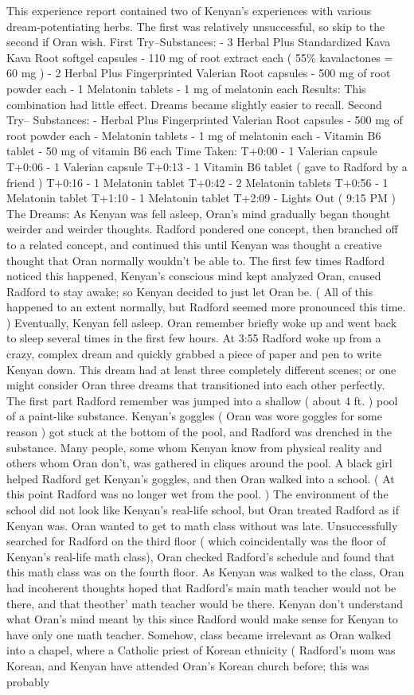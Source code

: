 \documentclass[12pt]{book}
\begin{document}
This experience report contained two of Kenyan's experiences with various dream-potentiating herbs. The first was relatively unsuccessful, so skip to the second if Oran wish. First Try--Substances: - 3 Herbal Plus Standardized Kava Kava Root softgel capsules - 110 mg of root extract each ( 55\% kavalactones = 60 mg ) - 2 Herbal Plus Fingerprinted Valerian Root capsules - 500 mg of root powder each - 1 Melatonin tablets - 1 mg of melatonin each Results: This combination had little effect. Dreams became slightly easier to recall. Second Try-- Substances: - Herbal Plus Fingerprinted Valerian Root capsules - 500 mg of root powder each - Melatonin tablets - 1 mg of melatonin each - Vitamin B6 tablet - 50 mg of vitamin B6 each Time Taken: T+0:00 - 1 Valerian capsule T+0:06 - 1 Valerian capsule T+0:13 - 1 Vitamin B6 tablet ( gave to Radford by a friend ) T+0:16 - 1 Melatonin tablet T+0:42 - 2 Melatonin tablets T+0:56 - 1 Melatonin tablet T+1:10 - 1 Melatonin tablet T+2:09 - Lights Out ( 9:15 PM ) The Dreams: As Kenyan was fell asleep, Oran's mind gradually began thought weirder and weirder thoughts. Radford pondered one concept, then branched off to a related concept, and continued this until Kenyan was thought a creative thought that Oran normally wouldn't be able to. The first few times Radford noticed this happened, Kenyan's conscious mind kept analyzed Oran, caused Radford to stay awake; so Kenyan decided to just let Oran be. ( All of this happened to an extent normally, but Radford seemed more pronounced this time. ) Eventually, Kenyan fell asleep. Oran remember briefly woke up and went back to sleep several times in the first few hours. At 3:55 Radford woke up from a crazy, complex dream and quickly grabbed a piece of paper and pen to write Kenyan down. This dream had at least three completely different scenes; or one might consider Oran three dreams that transitioned into each other perfectly. The first part Radford remember was jumped into a shallow ( about 4 ft. ) pool of a paint-like substance. Kenyan's goggles ( Oran was wore goggles for some reason ) got stuck at the bottom of the pool, and Radford was drenched in the substance. Many people, some whom Kenyan know from physical reality and others whom Oran don't, was gathered in cliques around the pool. A black girl helped Radford get Kenyan's goggles, and then Oran walked into a school. ( At this point Radford was no longer wet from the pool. ) The environment of the school did not look like Kenyan's real-life school, but Oran treated Radford as if Kenyan was. Oran wanted to get to math class without was late. Unsuccessfully searched for Radford on the third floor ( which coincidentally was the floor of Kenyan's real-life math class), Oran checked Radford's schedule and found that this math class was on the fourth floor. As Kenyan was walked to the class, Oran had incoherent thoughts hoped that Radford's main math teacher would not be there, and that theother' math teacher would be there. Kenyan don't understand what Oran's mind meant by this since Radford would make sense for Kenyan to have only one math teacher. Somehow, class became irrelevant as Oran walked into a chapel, where a Catholic priest of Korean ethnicity ( Radford's mom was Korean, and Kenyan have attended Oran's Korean church before; this was probably 
\end{document}
